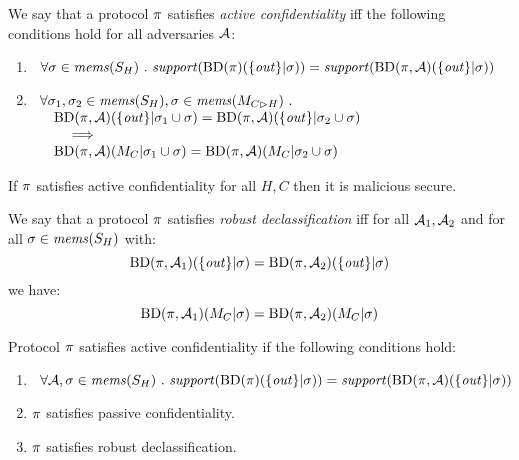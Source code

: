 \begin{definition}
  We say that a protocol $\pi$ satisfies \emph{active confidentiality} iff the following conditions hold
  for all adversaries $\mathcal{A}$:
  \begin{enumerate}
  \item $\ \,\forall \store \in \mems(S_H) \ .\ \support(\progtt(\prog)(\{ \outv \}|\store)) =
    \support(\progtt(\prog,\adversary)(\{ \outv \}|\store))$
  \item $\begin{array}[t]{l}\forall \sigma_1, \sigma_2 \in \mathit{mems}(S_H), \sigma \in \mathit{mems}(M_{C \rhd H})\ . \\
    \quad \mathrm{BD}(\pi,\mathcal{A})(\{ \mathit{out} \} |\sigma_1 \cup \sigma) = \mathrm{BD}(\pi,\mathcal{A})(\{ \mathit{out} \}|\sigma_2 \cup \sigma) \\
    \qquad \implies\\
    \quad \mathrm{BD}(\pi,\mathcal{A})(M_C|\sigma_1 \cup \sigma) = \mathrm{BD}(\pi,\mathcal{A})(M_C|\sigma_2 \cup \sigma)\end{array}$
  \end{enumerate}
\end{definition}

\begin{theorem}
  If $\pi$ satisfies active confidentiality for all $H,C$ then it is malicious secure.
\end{theorem}

\begin{definition}
  We say that a protocol $\pi$ satisfies \emph{robust declassification} iff for all $\mathcal{A}_1,\mathcal{A}_2$ and
  for all $\sigma \in \mathit{mems}(S_H)$ with: %
  $$
  \mathrm{BD}(\pi,\mathcal{A}_1)(\{ \mathit{out} \} | \sigma) = \mathrm{BD}(\pi,\mathcal{A}_2)(\{ \mathit{out} \}| \sigma)
  $$
  we have:
  $$
   \mathrm{BD}(\pi,\mathcal{A}_1)(M_C|\sigma) = \mathrm{BD}(\pi,\mathcal{A}_2)(M_C|\sigma)
  $$
\end{definition}

\begin{theorem}
  Protocol $\pi$ satisfies active confidentiality if the following conditions hold:
  \begin{enumerate}
  \item $\ \,\forall \mathcal{A}, \sigma \in \mathit{mems}(S_H) \ .\ \mathit{support}(\mathrm{BD}(\pi)(\{ \mathit{out} \}|\sigma)) =
    \mathit{support}(\mathrm{BD}(\pi,\mathcal{A})(\{ \mathit{out} \}|\sigma))$
  \item $\pi$ satisfies passive confidentiality.
  \item $\pi$ satisfies robust declassification.
  \end{enumerate}
\end{theorem}

